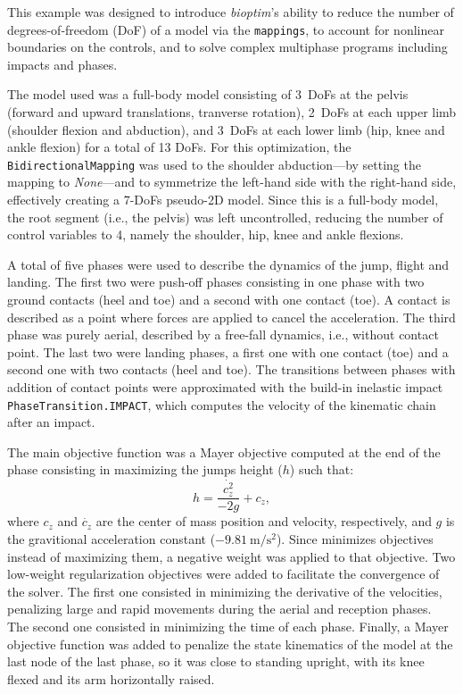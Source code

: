 This example was designed to introduce \emph{bioptim}'s ability to reduce the number of degrees-of-freedom (DoF) of a model via the \texttt{mappings}, to account for nonlinear boundaries on the controls, and to solve complex multiphase programs including impacts and  phases.

The model used was a full-body model consisting of 3~DoFs at the pelvis (forward and upward translations, tranverse rotation), 2~DoFs at each upper limb (shoulder flexion and abduction), and 3~DoFs at each lower limb (hip, knee and ankle flexion) for a total of 13 DoFs.
For this optimization, the \texttt{BidirectionalMapping} was used to  the shoulder abduction---by setting the mapping to \emph{None}---and to symmetrize the left-hand side with the right-hand side, effectively creating a 7-DoFs pseudo-2D model. 
Since this is a full-body model, the root segment (i.e., the pelvis) was left uncontrolled, reducing the number of control variables to 4, namely the shoulder, hip, knee and ankle flexions. 

A total of five phases were used to describe the dynamics of the jump, flight and landing. 
The first two were push-off phases consisting in one phase with two ground contacts (heel and toe) and a second with one contact (toe). 
A contact is described as a point where forces are applied to cancel the acceleration. 
The third phase was purely aerial, described by a free-fall dynamics, i.e., without contact point.
The last two were landing phases, a first one with one contact (toe) and a second one with two contacts (heel and toe).
The transitions between phases with addition of contact points were approximated with the build-in inelastic impact \texttt{PhaseTransition.IMPACT}, which computes the velocity of the kinematic chain after an impact.

The main objective function was a Mayer objective computed at the end of the  phase consisting in maximizing the jumps height ($h$) such that:
\[
h = \frac{\dot{c_z^2}}{-2 g} + c_z,
\]
where $c_z$ and $\dot{c_z}$ are the center of mass position and velocity, respectively, and $g$ is the gravitional acceleration constant ($\SI{-9.81}{\meter/\second^2}$).
Since \bioptim minimizes objectives instead of maximizing them, a negative weight was applied to that objective. 
Two low-weight regularization objectives were added to facilitate the convergence of the solver.
The first one consisted in minimizing the derivative of the velocities, penalizing large and rapid movements during the aerial and reception phases. 
The second one consisted in minimizing the time of each phase.
Finally, a Mayer objective function was added to penalize the state kinematics of the model at the last node of the last phase, so it was close to standing upright, with its knee flexed and its arm horizontally raised. 

